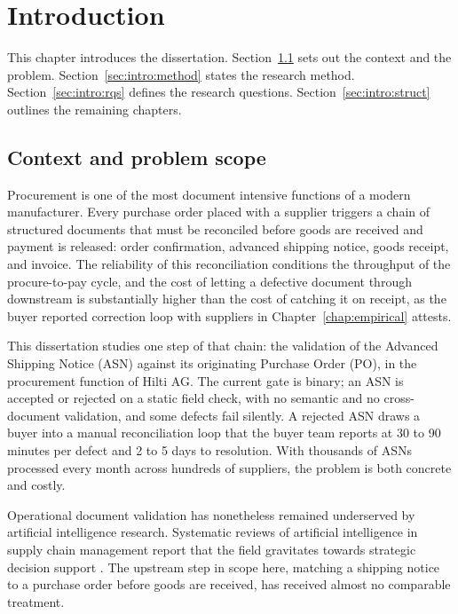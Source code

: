 
\chapter{Introduction} \label{chap:intro}

This chapter introduces the dissertation. Section~\ref{sec:intro:context} sets out the context and the problem. Section~\ref{sec:intro:method} states the research method. Section~\ref{sec:intro:rqs} defines the research questions. Section~\ref{sec:intro:struct} outlines the remaining chapters.


\section{Context and problem scope}
\label{sec:intro:context}

Procurement is one of the most document intensive functions of a modern manufacturer. Every purchase order placed with a supplier triggers a chain of structured documents that must be reconciled before goods are received and payment is released: order confirmation, advanced shipping notice, goods receipt, and invoice. The reliability of this reconciliation conditions the throughput of the procure-to-pay cycle, and the cost of letting a defective document through downstream is substantially higher than the cost of catching it on receipt, as the buyer reported correction loop with suppliers in Chapter~\ref{chap:empirical} attests.

This dissertation studies one step of that chain: the validation of the Advanced Shipping Notice (ASN) against its originating Purchase Order (PO), in the procurement function of Hilti AG. The current gate is binary; an ASN is accepted or rejected on a static field check, with no semantic and no cross-document validation, and some defects fail silently. A rejected ASN draws a buyer into a manual reconciliation loop that the buyer team reports at 30 to 90 minutes per defect and 2 to 5 days to resolution. With thousands of ASNs processed every month across hundreds of suppliers, the problem is both concrete and costly.

Operational document validation has nonetheless remained underserved by artificial intelligence research. Systematic reviews of artificial intelligence in supply chain management report that the field gravitates towards strategic decision support \citep{toorajipour2021,guida2023,bahroun2026}. The upstream step in scope here, matching a shipping notice to a purchase order before goods are received, has received almost no comparable treatment.

